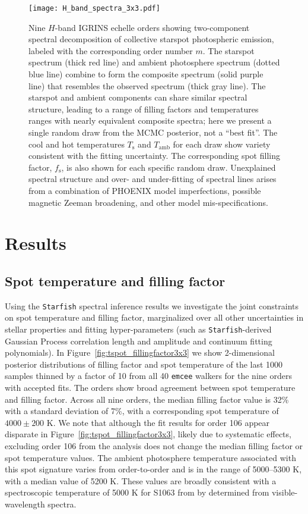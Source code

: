 \documentclass[twocolumn,tighten]{aastex631}
\begin{document}
\begin{figure*}[ht]
 \centering
 \texttt{[image: H\_band\_spectra\_3x3.pdf]}
 \caption{Nine $H$-band IGRINS echelle orders showing two-component spectral decomposition of collective starspot photospheric emission, labeled with the corresponding order number $m$.  The starspot spectrum (thick red line) and ambient photosphere spectrum (dotted blue line) combine to form the composite spectrum (solid purple line) that resembles the observed spectrum (thick gray line).  The starspot and ambient components can share similar spectral structure, leading to a range of filling factors and temperatures ranges with nearly equivalent composite spectra; here we present a single random draw from the MCMC posterior, not a ``best fit''.  The cool and hot temperatures $T_{\mathrm{s}}$ and $T_{\mathrm{amb}}$ for each draw show variety consistent with the fitting uncertainty. The corresponding spot filling factor, $f_{\mathrm{s}}$, is also shown for each specific random draw. Unexplained spectral structure and over- and under-fitting of spectral lines arises from a combination of PHOENIX model imperfections, possible magnetic Zeeman broadening, and other model mis-specifications.}
 \label{fig:IGRINS_spectra3x3}
\end{figure*}

\section{Results}
\label{sec:results}

\subsection{Spot temperature and filling factor}
\label{sec:starfishresults}
Using the \texttt{Starfish} spectral inference results we investigate the joint constraints on spot temperature and filling factor, marginalized over all other uncertainties in stellar properties and fitting hyper-parameters (such as \texttt{Starfish}-derived Gaussian Process correlation length and amplitude and continuum fitting polynomials). In Figure~\ref{fig:tspot_fillingfactor3x3} we show 2-dimensional posterior distributions of filling factor and spot temperature of the last 1000 samples thinned by a factor of 10 from all 40 \texttt{emcee} walkers for the nine orders with accepted fits. The orders show broad agreement between spot temperature and filling factor. Across all nine orders, the median filling factor value is 32\% with a standard deviation of 7\%, with a corresponding spot temperature of $4000 \pm 200$ K. We note that although the fit results for order 106 appear disparate in Figure~\ref{fig:tspot_fillingfactor3x3}, likely due to systematic effects, excluding order 106 from the analysis does not change the median filling factor or spot temperature values. The ambient photosphere temperature associated with this spot signature varies from order-to-order and is in the range of 5000--5300 K, with a median value of 5200 K.  These values are broadly consistent with a spectroscopic temperature of 5000 K for S1063 from by \citet{mathieu03} determined from visible-wavelength spectra. 
\end{document}

